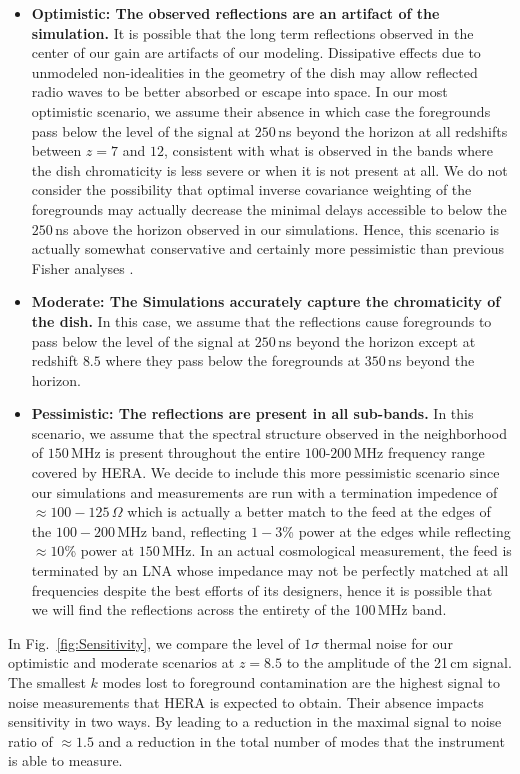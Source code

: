 \documentclass[twocolumn]{emulateapj}
\begin{document}
\begin{itemize}
\item {\bf Optimistic: The observed reflections are an artifact of the simulation.} It is possible that the long term reflections observed in the center of our gain are artifacts of our modeling. Dissipative effects due to unmodeled non-idealities in the geometry of the dish may allow reflected radio waves to be better absorbed or escape into space. In our most optimistic scenario, we assume their absence in which case the foregrounds pass below the level of the signal at $250$\,ns beyond the horizon at all redshifts between $z=7$ and $12$, consistent with what is observed in the bands where the dish chromaticity is less severe or when it is not present at all. We do not consider the possibility that optimal inverse covariance weighting of the foregrounds  may actually decrease the minimal delays accessible to below the $250$\,ns above the horizon observed in our simulations. Hence, this scenario is actually somewhat conservative and certainly more pessimistic than previous Fisher analyses \citet{Pober:2014,Liu:2015a,Liu:2015b,EwallWice:2015b}. 
 
\item {\bf Moderate: The Simulations accurately capture the chromaticity of the dish.} In this case, we assume that the reflections cause foregrounds to pass below the level of the signal at $250$\,ns beyond the horizon except at redshift $8.5$ where they pass below the foregrounds at $350$\,ns beyond the horizon. 


\item {\bf Pessimistic: The reflections are present in all sub-bands.} In this scenario, we assume that the spectral structure observed in the neighborhood of $150$\,MHz is present throughout the entire $100$-$200$\,MHz frequency range covered by HERA. We decide to include this more pessimistic scenario since our simulations and measurements are run with a termination impedence of $\approx 100-125$\,$\Omega$ which is actually a better match to the feed at the edges of the $100-200$\,MHz band, reflecting $1-3$\% power at the edges while reflecting $\approx 10$\% power at $150$\,MHz. In an actual cosmological measurement, the feed is terminated by an LNA whose impedance may not be perfectly matched at all frequencies despite the best efforts of its designers, hence it is possible that we will find the reflections across the entirety of the 100\,MHz band. 
 
\end{itemize}
In Fig.~\ref{fig:Sensitivity}, we compare the level of $1\sigma$ thermal noise for our optimistic and moderate scenarios at $z=8.5$ to the amplitude of the 21\,cm signal. The smallest $k$ modes lost to foreground contamination are the highest signal to noise measurements that HERA is expected to obtain. Their absence impacts sensitivity in two ways. By leading to a reduction in the maximal signal to noise ratio of $\approx 1.5$ and a reduction in the total number of modes that the instrument is able to measure. 
\end{document}
